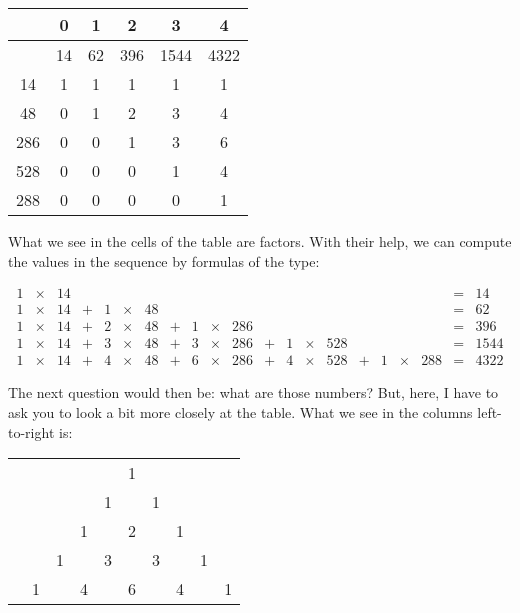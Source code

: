 \documentclass[tikz]{scrreprt}
\begin{document}
\begin{center}
\begingroup
\renewcommand{\arraystretch}{1.5}
\begin{tabular}{||c||c|c|c|c|c||}
\hline
     &  0 &  1  &  2  &  3   &  4   \\\hline
     & 14 & 62  & 396 & 1544 & 4322 \\\hline\hline
  14 &  1 &  1  &  1  &  1   &  1   \\\hline
  48 &  0 &  1  &  2  &  3   &  4   \\\hline
 286 &  0 &  0  &  1  &  3   &  6   \\\hline
 528 &  0 &  0  &  0  &  1   &  4   \\\hline
 288 &  0 &  0  &  0  &  0   &  1   \\\hline
\end{tabular}
\endgroup
\end{center}

What we see in the cells of the table
are factors. With their help, we can compute
the values in the sequence by formulas of the type:

\begin{equation}
\begin{array}{rcrcrcrcrcrcrcrcrcrcr}
  1 & \times & 14 &   &   &        &    &   &   &        &     &   &   &        &     &   &   &        &     & = & 14\\
  1 & \times & 14 & + & 1 & \times & 48 &   &   &        &     &   &   &        &     &   &   &        &     & = & 62\\
  1 & \times & 14 & + & 2 & \times & 48 & + & 1 & \times & 286 &   &   &        &     &   &   &        &     & = & 396\\
  1 & \times & 14 & + & 3 & \times & 48 & + & 3 & \times & 286 & + & 1 & \times & 528 &   &   &        &     & = & 1544\\
  1 & \times & 14 & + & 4 & \times & 48 & + & 6 & \times & 286 & + & 4 & \times & 528 & + & 1 & \times & 288 & = & 4322
\end{array}
\end{equation}

The next question would then be: what are those numbers?
But, here, I have to ask you to look a bit more closely at the table.
What we see in the columns left-to-right is:

\begin{center}
\begin{tabular}{cccccccccc}
  &   &     &    &     & 1 &      &   &   &   \\
  &   &     &    &  1  &   &  1   &   &   &   \\
  &   &     &  1 &     & 2 &      & 1 &   &   \\
  &   &  1  &    &  3  &   &  3   &   & 1 &    \\
  & 1 &     & 4  &     & 6 &      & 4 &   & 1 
\end{tabular}
\end{center}
\end{document}

